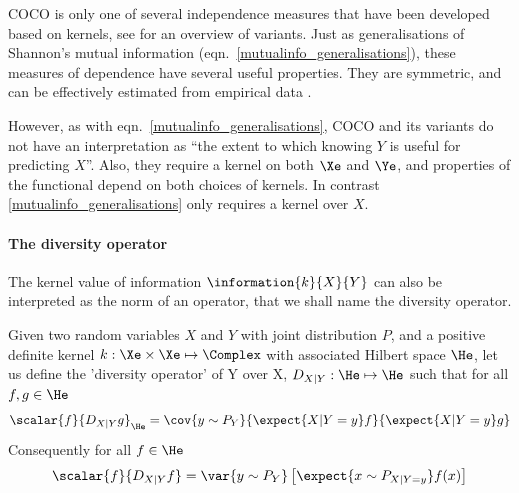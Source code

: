 COCO is only one of several independence measures that have been developed based on kernels, see \citep{HSIC} for an overview of variants. Just as generalisations of Shannon's mutual information (eqn.\ \eqref{mutualinfo_generalisations}), these measures of dependence have several useful properties. They are symmetric, and can be effectively estimated from empirical data \citep{}.

However, as with eqn.\ \eqref{mutualinfo_generalisations}, COCO and its variants do not have an interpretation as ``the extent to which knowing $Y$ is useful for predicting $X$''. Also, they require a kernel on both $\Xe$ and $\Ye$, and properties of the functional depend on both choices of kernels. In contrast \eqref{mutualinfo_generalisations} only requires a kernel over $X$.

\paragraph{The diversity operator} 

The kernel value of information $\information{k}{X}{Y}$ can also be interpreted as the norm of an operator, that we shall name the diversity operator.

\begin{definition}
Given two random variables $X$ and $Y$ with joint distribution $P$, and a positive definite kernel $k:\Xe\times\Xe\mapsto\Complex$ with associated Hilbert space $\He$, let us define the 'diversity operator' of Y over X, $D_{X\vert Y}:\He\mapsto\He$ such that for all $f,g\in\He$ 
\begin{align}
	\scalar{f}{D_{X\vert Y}g}_{\He} = \cov{y\sim P_Y}{\expect{X\vert Y=y} f}{\expect{X\vert Y=y} g}
\end{align}
Consequently for all $f\in\He$
\begin{align}
	\scalar{f}{D_{X\vert Y}f} = \var{y\sim P_Y} \left[ \expect{x\sim P_{X\vert Y=y}} f(x) \right]
\end{align}
\end{definition}


